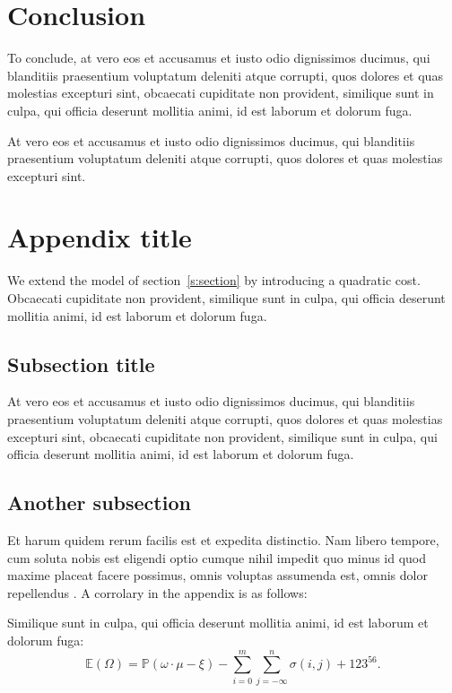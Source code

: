 \documentclass[letterpaper,12pt,leqno]{article}
\newcommand{\bib}{bibliography.bib}
\begin{document}
\section{Conclusion}\label{s:conclusion}

To conclude, at vero eos et accusamus et iusto odio dignissimos ducimus, qui blanditiis praesentium voluptatum deleniti atque corrupti, quos dolores et quas molestias excepturi sint, obcaecati cupiditate non provident, similique sunt in culpa, qui officia deserunt mollitia animi, id est laborum et dolorum fuga. 

At vero eos et accusamus et iusto odio dignissimos ducimus, qui blanditiis praesentium voluptatum deleniti atque corrupti, quos dolores et quas molestias excepturi sint.



\newpage
\appendix
\section{Appendix title}\label{a:appendix1}

We extend the model of section~\ref{s:section} by introducing a quadratic cost. Obcaecati cupiditate non provident, similique sunt in culpa, qui officia deserunt mollitia animi, id est laborum et dolorum fuga. 

\subsection{Subsection title} 

At vero eos et accusamus et iusto odio dignissimos ducimus, qui blanditiis praesentium voluptatum deleniti atque corrupti, quos dolores et quas molestias excepturi sint, obcaecati cupiditate non provident, similique sunt in culpa, qui officia deserunt mollitia animi, id est laborum et dolorum fuga. 

\subsection{Another subsection}

 Et harum quidem rerum facilis est et expedita distinctio. Nam libero tempore, cum soluta nobis est eligendi optio cumque nihil impedit quo minus id quod maxime placeat facere possimus, omnis voluptas assumenda est, omnis dolor repellendus \citep{MS22a}. A corrolary in the appendix is as follows:

\begin{corollary} Similique sunt in culpa, qui officia deserunt mollitia animi, id est laborum et dolorum fuga:
\begin{equation*}
\mathbb{E}(\Omega) = \mathbb{P}(\omega\cdot \mu - \xi) - \sum_{i=0}^{m}\sum_{j=-\infty}^{n} \sigma(i,j) + 123^{56}.
\end{equation*}\end{corollary}
\end{document}
